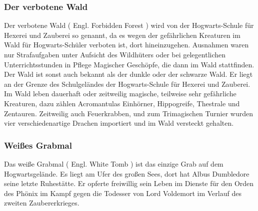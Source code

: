 \documentclass[a4paper, 10pt]{article}
\begin{document}
\subsubsection*{\large Der verbotene Wald}
Der verbotene Wald (  Engl.  Forbidden Forest ) wird von der Hogwarts-Schule für Hexerei und Zauberei so genannt, da es wegen der gefährlichen Kreaturen im Wald für Hogwarts-Schüler verboten ist, dort hineinzugehen. Ausnahmen waren nur Strafaufgaben unter Aufsicht des Wildhüters oder bei gelegentlichen Unterrichtsstunden in Pflege Magischer Geschöpfe, die dann im Wald stattfinden. Der Wald ist sonst auch bekannt als der dunkle oder der schwarze Wald. Er liegt an der Grenze des Schulgeländes der Hogwarts-Schule für Hexerei und Zauberei.
\vspace{10pt}
\newline
{}  
Im Wald leben dauerhaft oder zeitweilig magische, teilweise sehr gefährliche Kreaturen, dazu zählen Acromantulas Einhörner, Hippogreife, Thestrale und Zentauren. Zeitweilig auch Feuerkrabben, und zum Trimagischen Turnier wurden vier verschiedenartige Drachen importiert und im Wald versteckt gehalten.
\subsubsection*{\large Weißes Grabmal}
Das weiße Grabmal (  Engl.  White Tomb ) ist das einzige Grab auf dem Hogwartsgelände. Es liegt am Ufer des großen Sees, dort hat Albus Dumbledore seine letzte Ruhestätte. Er opferte freiwillig sein Leben im Dienste für den Orden des Phönix im Kampf gegen die Todesser von Lord Voldemort im Verlauf des zweiten Zaubererkrieges.
\end{document}
